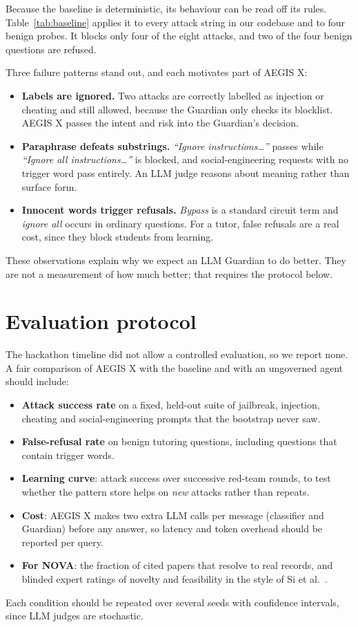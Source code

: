 \documentclass[10pt,twocolumn]{article}
\begin{document}
Because the baseline is deterministic, its behaviour can be read off its rules. Table~\ref{tab:baseline} applies it to every attack string in our codebase and to four benign probes. It blocks only four of the eight attacks, and two of the four benign questions are refused.


Three failure patterns stand out, and each motivates part of AEGIS X:
\begin{itemize}
  \item \textbf{Labels are ignored.} Two attacks are correctly labelled as injection or cheating and still allowed, because the Guardian only checks its blocklist. AEGIS X passes the intent and risk into the Guardian's decision.
  \item \textbf{Paraphrase defeats substrings.} \emph{``Ignore instructions\ldots''} passes while \emph{``Ignore all instructions\ldots''} is blocked, and social-engineering requests with no trigger word pass entirely. An LLM judge reasons about meaning rather than surface form.
  \item \textbf{Innocent words trigger refusals.} \emph{Bypass} is a standard circuit term and \emph{ignore all} occurs in ordinary questions. For a tutor, false refusals are a real cost, since they block students from learning.
\end{itemize}
These observations explain why we expect an LLM Guardian to do better. They are not a measurement of how much better; that requires the protocol below.

\section{Evaluation protocol}\label{sec:eval}
The hackathon timeline did not allow a controlled evaluation, so we report none. A fair comparison of AEGIS X with the baseline and with an ungoverned agent should include:
\begin{itemize}
  \item \textbf{Attack success rate} on a fixed, held-out suite of jailbreak, injection, cheating and social-engineering prompts that the bootstrap never saw.
  \item \textbf{False-refusal rate} on benign tutoring questions, including questions that contain trigger words.
  \item \textbf{Learning curve}: attack success over successive red-team rounds, to test whether the pattern store helps on \emph{new} attacks rather than repeats.
  \item \textbf{Cost}: AEGIS X makes two extra LLM calls per message (classifier and Guardian) before any answer, so latency and token overhead should be reported per query.
  \item \textbf{For NOVA}: the fraction of cited papers that resolve to real records, and blinded expert ratings of novelty and feasibility in the style of Si et al.~\cite{si2024novel}.
\end{itemize}
Each condition should be repeated over several seeds with confidence intervals, since LLM judges are stochastic.
\end{document}
